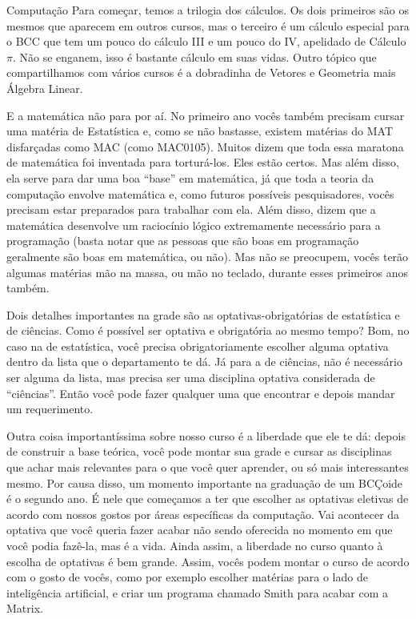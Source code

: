 \begin{subsecao}{Computação}
Para começar, temos a trilogia dos cálculos. Os dois primeiros são os mesmos
que aparecem em outros cursos, mas o terceiro é um cálculo especial para o BCC
que tem um pouco do cálculo III e um pouco do IV, apelidado de Cálculo $\pi$.
Não se enganem, isso é bastante cálculo em suas vidas. Outro tópico que
compartilhamos com vários cursos é a dobradinha de Vetores e Geometria mais
Álgebra Linear. 

E a matemática não para por aí. No primeiro ano vocês também precisam cursar
uma matéria de Estatística e, como se não bastasse, existem matérias do MAT
disfarçadas como MAC (como MAC0105). Muitos dizem que toda essa maratona de
matemática foi inventada para torturá-los. Eles estão certos. Mas além disso,
ela serve para dar uma boa ``base'' em matemática, já que toda a teoria da
computação envolve matemática e, como futuros possíveis pesquisadores, vocês
precisam estar preparados para trabalhar com ela. Além disso, dizem que a
matemática desenvolve um raciocínio lógico extremamente necessário para a
programação (basta notar que as pessoas que são boas em programação geralmente
são boas em matemática, ou não). Mas não se preocupem, vocês terão algumas
matérias mão na massa, ou mão no teclado, durante esses primeiros anos também.

Dois detalhes importantes na grade são as optativas-obrigatórias de
estatística e de ciências. Como é possível ser optativa e obrigatória ao mesmo
tempo? Bom, no caso na de estatística, você precisa obrigatoriamente escolher
alguma optativa dentro da lista que o departamento te dá. Já para a de
ciências, não é necessário ser alguma da lista, mas precisa ser uma disciplina
optativa considerada de ``ciências''. Então você pode fazer qualquer uma que
encontrar e depois mandar um requerimento.

Outra coisa importantíssima sobre nosso curso é a liberdade que ele te dá:
depois de construir a base teórica, você pode montar sua grade e cursar as
disciplinas que achar mais relevantes para o que você quer aprender, ou só
mais interessantes mesmo. Por causa disso, um momento importante na graduação
de um BCÇoide é o segundo ano. É nele que começamos a ter que escolher as
optativas eletivas de acordo com nossos gostos por áreas específicas da
computação. Vai acontecer da optativa que você queria fazer acabar não sendo
oferecida no momento em que você podia fazê-la, mas é a vida. Ainda assim, a
liberdade no curso quanto à escolha de optativas é bem grande. Assim, vocês
podem montar o curso de acordo com o gosto de vocês, como por exemplo escolher
matérias para o lado de inteligência artificial, e criar um programa chamado
Smith para acabar com a Matrix.


\end{subsecao}
